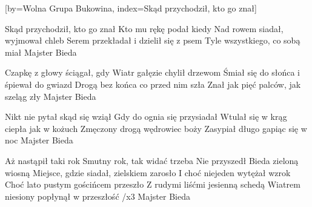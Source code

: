 [by={Wolna Grupa Bukowina},
                     index={Skąd przychodził, kto go znał}]
\beginverse

Skąd przychodził, kto go znał
Kto mu rękę podał kiedy
Nad rowem siadał, wyjmował chleb
Serem przekładał i dzielił się z psem
Tyle wszystkiego, co sobą miał
Majster Bieda

\endverse
\beginverse

Czapkę z głowy ściągał, gdy
Wiatr gałęzie chylił drzewom
Śmiał się do słońca i śpiewał do gwiazd
Drogą bez końca co przed nim szła
Znał jak pięć palców, jak szeląg zły
Majster Bieda

\endverse
\beginverse

Nikt nie pytał skąd się wziął
Gdy do ognia się przysiadał
Wtulał się w krąg ciepła jak w kożuch
Zmęczony drogą wędrowiec boży
Zasypiał długo gapiąc się w noc
Majster Bieda

\endverse
\beginverse

Aż nastąpił taki rok
Smutny rok, tak widać trzeba
Nie przyszedł Bieda zieloną wiosną
Miejsce, gdzie siadał, zielskiem zarosło
I choć niejeden wytężał wzrok
Choć lato pustym gościńcem przeszło
Z rudymi liśćmi jesienną schedą
Wiatrem niesiony popłynął w przeszłość /x3
Majster Bieda

\endverse
\endsong